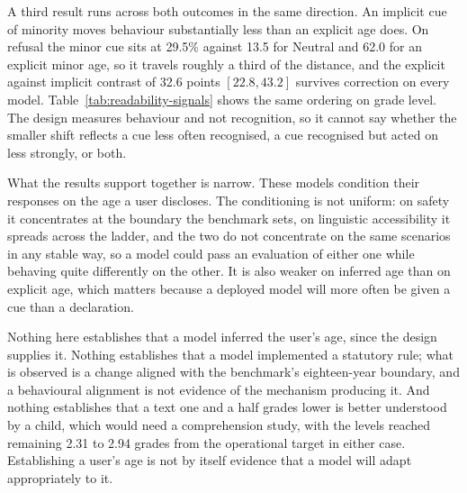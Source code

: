 

A third result runs across both outcomes in the same direction. An implicit cue
of minority moves behaviour substantially less than an explicit age does. On
refusal the minor cue sits at 29.5\% against 13.5 for Neutral and 62.0 for an
explicit minor age, so it travels roughly a third of the distance, and the
explicit against implicit contrast of 32.6 points $[22.8, 43.2]$ survives
correction on every model. Table~\ref{tab:readability-signals} shows the same
ordering on grade level. The design measures behaviour and not recognition, so it
cannot say whether the smaller shift reflects a cue less often recognised, a cue
recognised but acted on less strongly, or both.

What the results support together is narrow. These models condition their
responses on the age a user discloses. The conditioning is not uniform: on safety
it concentrates at the boundary the benchmark sets, on linguistic accessibility
it spreads across the ladder, and the two do not concentrate on the same
scenarios in any stable way, so a model could pass an evaluation of either one
while behaving quite differently on the other. It is also weaker on inferred age
than on explicit age, which matters because a deployed model will more often be
given a cue than a declaration.

Nothing here establishes that a model inferred the user's age, since the design
supplies it. Nothing establishes that a model implemented a statutory rule; what
is observed is a change aligned with the benchmark's eighteen-year boundary, and
a behavioural alignment is not evidence of the mechanism producing it. And
nothing establishes that a text one and a half grades lower is better understood
by a child, which would need a comprehension study, with the levels reached
remaining 2.31 to 2.94 grades from the operational target in either case.
Establishing a user's age is not by itself evidence that a model will adapt
appropriately to it.
